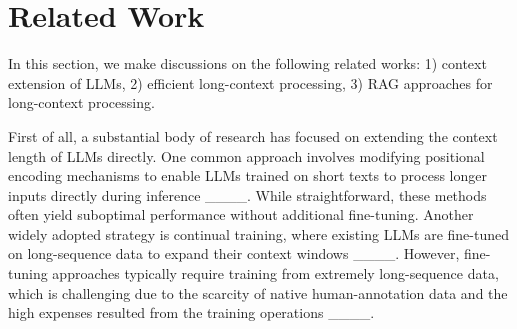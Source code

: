\section{Related Work}
In this section, we make discussions on the following related works: 1) context extension of LLMs, 2) efficient long-context processing, 3) RAG approaches for long-context processing.  

First of all, a substantial body of research has focused on extending the context length of LLMs directly. One common approach involves modifying positional encoding mechanisms to enable LLMs trained on short texts to process longer inputs directly during inference ____. While straightforward, these methods often yield suboptimal performance without additional fine-tuning. Another widely adopted strategy is continual training, where existing LLMs are fine-tuned on long-sequence data to expand their context windows ____. However, fine-tuning approaches typically require training from extremely long-sequence data, which is challenging due to the scarcity of native human-annotation data and the high expenses resulted from the training operations ____. 



